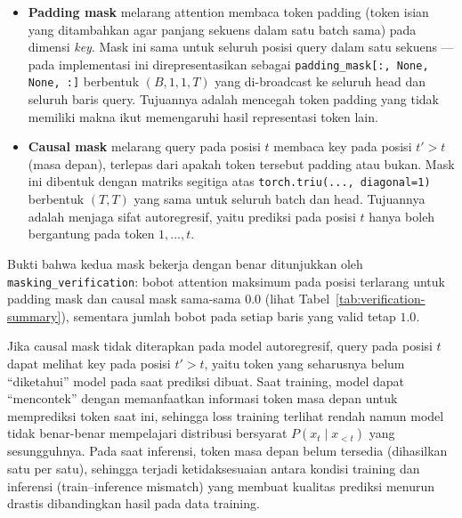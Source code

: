 \documentclass[12pt,a4paper]{article}
\newcommand{\code}[1]{\texttt{\small #1}}
\begin{document}
\begin{itemize}
    \item \textbf{Padding mask} melarang attention membaca token padding
    (token isian yang ditambahkan agar panjang sekuens dalam satu batch
    sama) pada dimensi \emph{key}. Mask ini sama untuk seluruh posisi query
    dalam satu sekuens --- pada implementasi ini direpresentasikan sebagai
    \code{padding\_mask[:, None, None, :]} berbentuk $(B, 1, 1, T)$ yang
    di-broadcast ke seluruh head dan seluruh baris query. Tujuannya adalah
    mencegah token padding yang tidak memiliki makna ikut memengaruhi hasil
    representasi token lain.
    \item \textbf{Causal mask} melarang query pada posisi $t$ membaca key
    pada posisi $t' > t$ (masa depan), terlepas dari apakah token tersebut
    padding atau bukan. Mask ini dibentuk dengan matriks segitiga atas
    \code{torch.triu(..., diagonal=1)} berbentuk $(T, T)$ yang sama untuk
    seluruh batch dan head. Tujuannya adalah menjaga sifat autoregresif,
    yaitu prediksi pada posisi $t$ hanya boleh bergantung pada token
    $1, \dots, t$.
\end{itemize}

Bukti bahwa kedua mask bekerja dengan benar ditunjukkan oleh
\code{masking\_verification}: bobot attention maksimum pada posisi terlarang
untuk padding mask dan causal mask sama-sama $0.0$ (lihat
Tabel~\ref{tab:verification-summary}), sementara jumlah bobot pada setiap
baris yang valid tetap $1.0$.

Jika causal mask tidak diterapkan pada model autoregresif, query pada
posisi $t$ dapat melihat key pada posisi $t' > t$, yaitu token yang
seharusnya belum ``diketahui'' model pada saat prediksi dibuat. Saat
training, model dapat ``mencontek'' dengan memanfaatkan informasi token
masa depan untuk memprediksi token saat ini, sehingga loss training terlihat
rendah namun model tidak benar-benar mempelajari distribusi bersyarat
$P(x_t \mid x_{<t})$ yang sesungguhnya. Pada saat inferensi, token masa
depan belum tersedia (dihasilkan satu per satu), sehingga terjadi
ketidaksesuaian antara kondisi training dan inferensi (train--inference
mismatch) yang membuat kualitas prediksi menurun drastis dibandingkan hasil
pada data training.
\end{document}

